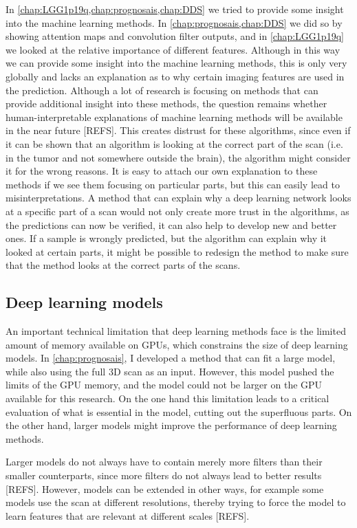 In \cref{chap:LGG1p19q,chap:prognosais,chap:DDS} we  tried to provide some insight into the machine learning methods.
In \cref{chap:prognosais,chap:DDS} we did so by showing attention maps and convolution filter outputs, and in \cref{chap:LGG1p19q} we looked at the relative importance of different features.
Although in this way we can provide some insight into the machine learning methods, this is only very globally and lacks an explanation as to why certain imaging features are used in the prediction.
Although a lot of research is focusing on methods that can provide additional insight into these methods, the question remains whether human-interpretable explanations of machine learning methods will be available in the near future [REFS].
This creates distrust for these algorithms, since even if it can be shown that an algorithm is looking at the correct part of the scan (i.e. in the tumor and not somewhere outside the brain), the algorithm might consider it for the wrong reasons.
It is easy to attach our own explanation to these methods if we see them focusing on particular parts, but this can easily lead to misinterpretations.
A method that can explain why a deep learning network looks at a specific part of a scan would not only create more trust in the algorithms, as the predictions can now be verified, it can also help to develop new and better ones.
If a sample is wrongly predicted, but the algorithm can explain why it looked at certain parts, it might be possible to redesign the method to make sure that the method looks at the correct parts of the scans.

\subsection{Deep learning models}

An important technical limitation that deep learning methods face is the limited amount of memory available on GPUs, which constrains the size of deep learning models.
In \cref{chap:prognosais}, I developed a method that can fit a large model, while also using the full 3D scan as an input.
However, this model pushed the limits of the GPU memory, and the model could not be larger on the GPU available for this research.
On the one hand this limitation leads to a critical evaluation of what is essential in the model, cutting out the superfluous parts.
On the other hand, larger models might improve the performance of deep learning methods.

Larger models do not always have to contain merely more filters than their smaller counterparts, since more filters do not always lead to better results [REFS].
However, models can be extended in other ways, for example some models use the scan at different resolutions, thereby trying to force the model to learn features that are relevant at different scales [REFS].

